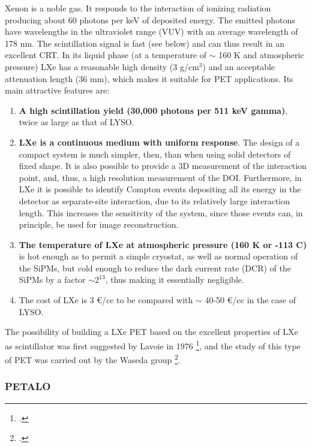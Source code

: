 Xenon is a noble gas. It responds to the interaction of ionizing radiation producing about 60 photons per keV of deposited energy. The emitted photons have wavelengths in the ultraviolet range (VUV)
with an average wavelength of 178 nm. The scintillation signal is fast 
(see below) and can thus result in an excellent CRT.  In its liquid phase (at a temperature of $\sim$ 160 K and atmospheric pressure) LXe has a reasonable high density (3 g/cm$^3$) and an acceptable attenuation length (36 mm), which makes it suitable for PET applications. Its main attractive features are:

\begin{enumerate}
\item {\bf A high scintillation yield (30,000 photons per 511 keV gamma)}, twice as large as that of LYSO. 
\item {\bf LXe is a continuous medium with uniform response}. The design of a compact system is much simpler, then, than when using solid detectors of fixed shape. It is also possible to provide a 3D measurement of the interaction point, and, thus, a high resolution measurement of the DOI. Furthermore, in LXe it is possible to identify Compton events depositing all its energy in the detector as separate-site interaction, due to its relatively large interaction length. This increases the sensitivity of the system, since those events can, in principle, be used for image reconstruction. 
\item {\bf The temperature of LXe at atmospheric pressure (160 K or -113 C)} is hot enough as to permit a simple cryostat, as well as normal operation of the SiPMs, but cold enough to reduce the dark current rate (DCR) of the SiPMs by a factor $\sim 2^{13}$, thus making it essentially negligible. 
\item {The cost} of LXe is 3 \euro/cc to be compared with $\sim$ 40-50 \euro/cc in the case of LYSO. 
 \end{enumerate}

The possibility of building a LXe PET based on the excellent properties of LXe as scintillator was first suggested by Lavoie in 1976  \footcite{lavoie}, and the study of this type of PET was carried out by the Waseda group \footcite{Doke1,Nishikido2,Nishikido1}. 

\subsubsection*{PETALO}



